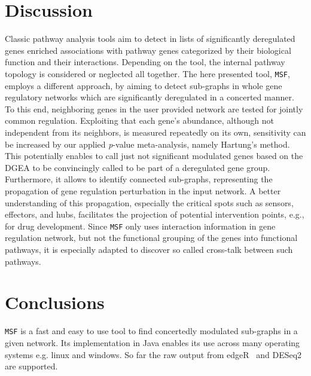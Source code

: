\documentclass[10pt,a4paper,twocolumn]{article}
\begin{document}
	\section*{Discussion}
	
	Classic pathway analysis tools aim to detect in lists of
        significantly deregulated genes enriched associations with
        pathway genes categorized by their biological function and
        their interactions. Depending on the tool, the internal
        pathway topology is considered or neglected all together. The
        here presented tool, \texttt{MSF}, employs a different
        approach, by aiming to detect sub-graphs in whole gene
        regulatory networks which are significantly deregulated in a
        concerted manner. To this end, neighboring genes in the user
        provided network are tested for jointly common
        regulation. Exploiting that each gene's abundance, although
        not independent from its neighbors, is measured repeatedly on
        its own, sensitivity can be increased by our applied
        \textit{p}-value meta-analysis, namely Hartung's method. This
        potentially enables to call just not significant modulated
        genes based on the DGEA to be convincingly called to be part
        of a deregulated gene group.  Furthermore, it allows to
        identify connected sub-graphs, representing the propagation of
        gene regulation perturbation in the input network. A better
        understanding of this propagation, especially the critical
        spots such as sensors, effectors, and hubs, facilitates the
        projection of potential intervention points, e.g., for drug
        development. Since \texttt{MSF} only uses interaction
        information in gene regulation network, but not the functional
        grouping of the genes into functional pathways, it is
        especially adapted to discover so called cross-talk between
        such pathways.
	
	
	\section*{Conclusions}
	
	
	\texttt{MSF} is a fast and easy to use tool to find
        concertedly modulated sub-graphs in a given network. Its
        implementation in Java enables its use across many operating
        systems e.g. linux and windows. So far the raw output from
        edgeR~\cite{edgeR} and DESeq2~\cite{love2014moderated} are
        supported.
	
\end{document}
